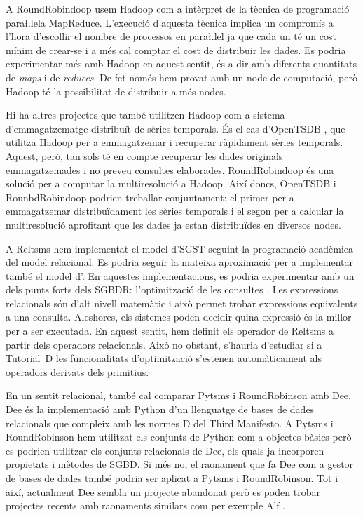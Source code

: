 
A RoundRobindoop usem Hadoop com a intèrpret de la tècnica de
programació para\l.lela MapReduce. L'execució d'aquesta tècnica
implica un compromís a l'hora d'escollir el nombre de processos en
para\l.lel ja que cada un té un cost mínim de crear-se i a més cal
comptar el cost de distribuir les dades. Es podria experimentar més
amb Hadoop en aquest sentit, és a dir amb diferents quantitats de
\emph{maps} i de \emph{reduces}. De fet només hem provat amb un node
de computació, però Hadoop té la possibilitat de distribuir a més
nodes.


Hi ha altres projectes que també utilitzen Hadoop com a sistema
d'emmagatzematge distribuït de sèries temporals. És el cas
d'OpenTSDB \parencite{opentsdb}, que utilitza Hadoop per a
emmagatzemar i recuperar ràpidament sèries temporals.  Aquest, però,
tan sols té en compte recuperar les dades originals emmagatzemades i
no preveu consultes elaborades.  RoundRobindoop és una
solució per a computar la multiresolució a Hadoop. Així doncs,
OpenTSDB i RounbdRobindoop podrien treballar conjuntament: el primer
per a emmagatzemar distribuïdament les sèries temporals i el segon per
a calcular la multiresolució aprofitant que les dades ja estan
distribuïdes en diversos nodes.





A Reltsms hem implementat el model d'\gls{SGST} seguint la programació
acadèmica del model relacional. Es podria seguir la mateixa
aproximació per a implementar també el model d'.  En
aquestes implementacions, es podria experimentar amb un dels punts
forts dels \gls{SGBDR}: l'optimització de les
consultes \parencite[\gls{capitol}~18
\emph{Optimization}]{date04:introduction8}. Les expressions
relacionals són d'alt nivell matemàtic i això permet trobar
expressions equivalents a una consulta. Aleshores, els sistemes poden
decidir quina expressió és la millor per a ser executada.  En aquest
sentit, hem definit els operador de Reltsms a partir dels operadors
relacionals. Això no obstant, s'hauria d'estudiar si a Tutorial~D les
funcionalitats d'optimització s'estenen automàticament als operadors
derivats dels primitius.



En un sentit relacional, també cal comparar Pytsms i RoundRobinson amb
Dee. Dee \parencite{dee} és la implementació amb Python d'un
llenguatge de bases de dades relacionals que compleix amb les normes D
del Third Manifesto. A Pytsms i RoundRobinson hem utilitzat els
conjunts de Python com a objectes bàsics però es podrien utilitzar els
conjunts relacionals de Dee, els quals ja incorporen propietats i
mètodes de \gls{SGBD}. Si més no, el raonament que fa Dee com a gestor
de bases de dades també podria ser aplicat a Pytsms i
RoundRobinson. Tot i així, actualment Dee sembla un projecte abandonat
però es poden trobar projectes recents amb raonaments similars com per exemple
Alf \parencite{alf}.
  



